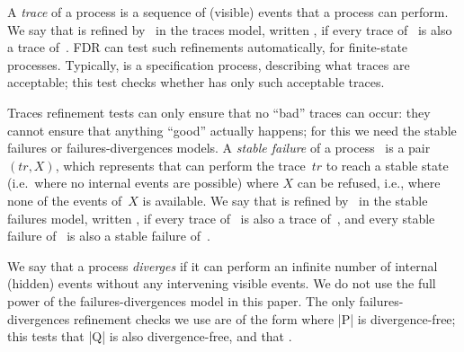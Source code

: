 A \emph{trace} of a process is a sequence of (visible) events that a process
can perform.  We say that  is refined by~ in the traces model,
written \CSPM{P [T= Q}, if every trace of~ is also a trace
of~\@.  FDR can test such refinements automatically, for finite-state
processes.  Typically,  is a specification process, describing what
traces are acceptable; this test checks whether  has only such
acceptable traces.  

Traces refinement tests can only ensure that no ``bad'' traces can occur: they
cannot ensure that anything ``good'' actually happens; for this we need the
stable failures or failures-divergences models.  A \emph{stable failure} of a
process~ is a pair $(tr,X)$, which represents that  can
perform the trace~$tr$ to reach a stable state (i.e.~where no internal events
are possible) where $X$ can be refused, i.e., where none of the events of~$X$
is available.  We say that  is refined by~ in the stable
failures model, written \CSPM{P [F= Q}, if every trace of~ is also a
  trace of~, and every stable failure of~ is also a stable
  failure of~.

We say that a process \emph{diverges} if it can perform an infinite number of
internal (hidden) events without any intervening visible events.  We do not
use the full power of the failures-divergences model in this paper.  The only
failures-divergences refinement checks we use are of the form \CSPM{P [FD= Q}
  where |P| is divergence-free; this tests that |Q| is also divergence-free,
  and that \CSPM{P [F= Q}.




